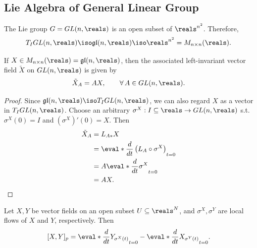 \documentclass[../main.tex]{subfiles}
\begin{document}
\subsection{Lie Algebra of General Linear Group}
\begin{theorem}
\label{thm:The-Shape-of-GL-and-gl}
    The Lie group \(G = \GL{n}{\reals}\) is an open subset of \(\reals
    ^{n^2}\). Therefore, 
    \[
        T_I\GL{n}{\reals} \iso \gl{n}{\reals} \iso \reals ^{n^2} = 
        M_{n\times n}(\reals).
    \]
\end{theorem}
\begin{theorem}
\label{thm:Left-Invariant-Vector-Fields-in-GL}
    If \(X \in M_{n\times n}(\reals) = \gl{n}{\reals}\), then the
    associated left-invariant vector field \(\tilde{X}\) on \(\GL{n}{\reals}\)
    is given by
    \[
        \tilde{X}_A = AX, \qquad \forall\, A \in \GL{n}{\reals}.
    \]
\end{theorem}
\begin{proof}
    Since \(\gl{n}{\reals} \iso T_I\GL{n}{\reals}\), we can also regard
    \(X\) as a vector in \(T_I\GL{n}{\reals}\).
    Choose an arbitrary \(\sigma^X : I \subseteq \reals \to
    \GL{n}{\reals}\) s.t. \(\sigma^X(0) = I\) and \((\sigma^X)'(0)=X\).
    Then
    \[
    \begin{aligned}
        \tilde{X}_A &= L_{A*}X \\
        &= \eval*{\frac{d}{dt}\left( L_A\circ \sigma^X \right) }_{t=0} \\
        &= A \eval*{\frac{d}{dt}\sigma^X}_{t=0} \\
        &= AX.
    \end{aligned}
    \]
\end{proof}
\begin{theorem}
\label{thm:Alternative-Expression-of-Lie-Bracket}
    Let \(X, Y\) be vector fields on an open subset \(U \subseteq \reals
    ^{N}\), and \(\sigma^X, \sigma^Y\) are local flows of \(X \) and
    \(Y\), respectively. Then
    \[
        [X, Y]_p = \eval*{\frac{d}{dt}Y_{\sigma^X(t)}}_{t=0} -
        \eval*{\frac{d}{dt}X_{\sigma^Y(t)}}_{t=0}.
    \]
\end{theorem}
\end{document}
